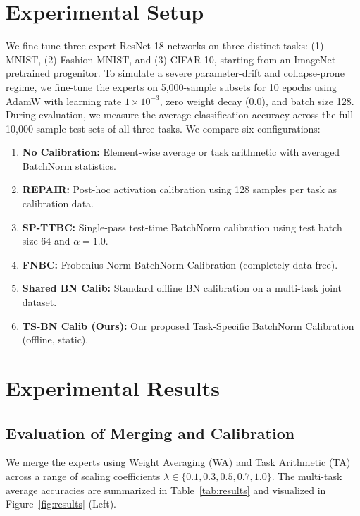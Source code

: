\documentclass{article}
\theoremstyle{plain}
\theoremstyle{definition}
\theoremstyle{remark}
\begin{document}
\section{Experimental Setup}
We fine-tune three expert ResNet-18 networks on three distinct tasks: (1) MNIST, (2) Fashion-MNIST, and (3) CIFAR-10, starting from an ImageNet-pretrained progenitor. To simulate a severe parameter-drift and collapse-prone regime, we fine-tune the experts on 5,000-sample subsets for 10 epochs using AdamW with learning rate $1 \times 10^{-3}$, zero weight decay ($0.0$), and batch size 128. During evaluation, we measure the average classification accuracy across the full 10,000-sample test sets of all three tasks. We compare six configurations:
\begin{enumerate}
\item \textbf{No Calibration:} Element-wise average or task arithmetic with averaged BatchNorm statistics.
\item \textbf{REPAIR:} Post-hoc activation calibration using 128 samples per task as calibration data.
\item \textbf{SP-TTBC:} Single-pass test-time BatchNorm calibration using test batch size 64 and $\alpha = 1.0$.
\item \textbf{FNBC:} Frobenius-Norm BatchNorm Calibration (completely data-free).
\item \textbf{Shared BN Calib:} Standard offline BN calibration on a multi-task joint dataset.
\item \textbf{TS-BN Calib (Ours):} Our proposed Task-Specific BatchNorm Calibration (offline, static).
\end{enumerate}

\section{Experimental Results}
\subsection{Evaluation of Merging and Calibration}
We merge the experts using Weight Averaging (WA) and Task Arithmetic (TA) across a range of scaling coefficients $\lambda \in \{0.1, 0.3, 0.5, 0.7, 1.0\}$. The multi-task average accuracies are summarized in Table~\ref{tab:results} and visualized in Figure~\ref{fig:results} (Left).
\end{document}
